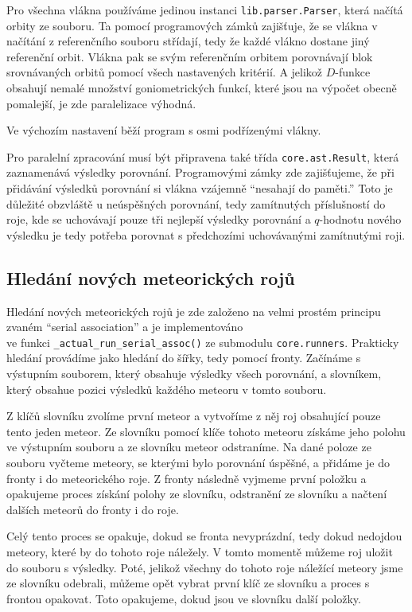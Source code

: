 Pro všechna vlákna používáme jedinou instanci \texttt{lib.parser.Parser}, která načítá orbity ze souboru. Ta pomocí programových zámků zajišťuje, že se vlákna v načítání z referenčního souboru střídají, tedy že každé vlákno dostane jiný referenční orbit. Vlákna pak se svým referenčním orbitem porovnávají blok srovnávaných orbitů pomocí všech nastavených kritérií. A jelikož $D$-funkce obsahují nemalé množství goniometrických funkcí, které jsou na výpočet obecně pomalejší, je zde paralelizace výhodná.

Ve výchozím nastavení běží program s osmi podřízenými vlákny.

\medskip

Pro paralelní zpracování musí být připravena také třída \texttt{core.ast.Result}, která zaznamenává výsledky porovnání. Programovými zámky zde zajišťujeme, že při přidávání výsledků porovnání si vlákna vzájemně "`nesahají do paměti."' Toto je důležité obzvláště u neúspěšných porovnání, tedy zamítnutých příslušností do roje, kde se uchovávají pouze tři nejlepší výsledky porovnání a $q$-hodnotu nového výsledku je tedy potřeba porovnat s předchozími uchovávanými zamítnutými roji.

\subsection{Hledání nových meteorických rojů\label{sec:practical:association}}%
Hledání nových meteorických rojů je zde založeno na velmi prostém principu zvaném "`serial association"' a je implementováno \\ve funkci \texttt{\_actual\_run\_serial\_assoc()} ze submodulu \texttt{core.runners}. Prakticky hledání provádíme jako hledání do šířky, tedy pomocí fronty. Začínáme s výstupním souborem, který obsahuje výsledky všech porovnání, a slovníkem, který obsahue pozici výsledků každého meteoru v tomto souboru.

Z klíčů slovníku zvolíme první meteor a vytvoříme z něj roj obsahující pouze tento jeden meteor. Ze slovníku pomocí klíče tohoto meteoru získáme jeho polohu ve výstupním souboru a ze slovníku meteor odstraníme. Na dané poloze ze souboru vyčteme meteory, se kterými bylo porovnání úspěšné, a přidáme je do fronty i do meteorického roje. Z fronty následně vyjmeme první položku a opakujeme proces získání polohy ze slovníku, odstranění ze slovníku a načtení dalších meteorů do fronty i do roje.

Celý tento proces se opakuje, dokud se fronta nevyprázdní, tedy dokud nedojdou meteory, které by do tohoto roje náležely. V tomto momentě můžeme roj uložit do souboru s výsledky. Poté, jelikož všechny do tohoto roje náležící meteory jsme ze slovníku odebrali, můžeme opět vybrat první klíč ze slovníku a proces s frontou opakovat. Toto opakujeme, dokud jsou ve slovníku další položky.

